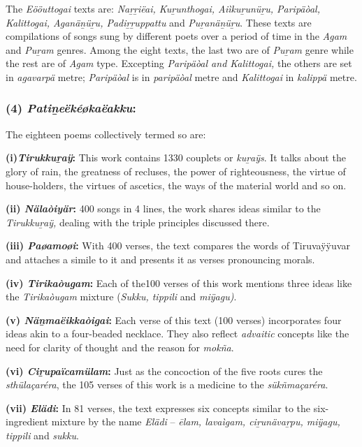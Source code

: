 The \textit{Eööuttogai} texts are: \textit{Naṟṟiëai, Kuṟunthogai, Aiìkuṟunüṟu, Paripäòal, Kalittogai, Aganäṉüṟu, Padiṟṟuppattu} and \textit{Puṟanäṉüṟu}. These texts are compilations of songs sung by different poets over a period of time in the \textit{Agam} and \textit{Puṟam} genres. Among the eight texts, the last two are of \textit{Puṟam} genre while the rest are of \textit{Agam} type. Excepting \textit{Paripäòal and Kalittogai,} the others are set in \textit{agavarpä} metre; \textit{Paripäòal} is in \textit{paripäòal} metre and \textit{Kalittogai} in \textit{kalippä} metre.


\subsubsection*{(4) \textit{Patiṉeëkéøkaëakku}:}

The eighteen poems collectively termed so are:

\textbf{(i)\textit{Tirukkuṟaÿ}:} This work contains 1330 couplets or \textit{kuṟaÿs}. It talks about the glory of rain, the greatness of recluses, the power of righteousness, the virtue of house-holders, the virtues of ascetics, the ways of the material world and so on.

\textbf{(ii) \textit{Nälaòiyär}:} 400 songs in 4 lines, the work shares ideas similar to the \textit{Tirukkuṟaÿ,} dealing with the triple principles discussed there.

\textbf{(iii) \textit{Paøamoøi}:} With 400 verses, the text compares the words of Tiruvaÿÿuvar and attaches a simile to it and presents it as verses pronouncing morals.

\textbf{(iv) \textit{Tirikaòugam}:} Each of the100 verses of this work mentions three ideas like the \textit{Tirikaòugam} mixture (\textit{Sukku, tippili} and \textit{miÿagu)}.

\textbf{(v) \textit{Näṉmaëikkaòigai}:} Each verse of this text (100 verses) incorporates four ideas akin to a four-beaded necklace. They also reflect \textit{advaitic} concepts like the need for clarity of thought and the reason for \textit{mokña}.

\textbf{(vi) \textit{Ciṟupaïcamülam}:} Just as the concoction of the five roots cures the \textit{sthülaçaréra}, the 105 verses of this work is a medicine to the \textit{sükñmaçaréra}.

\textbf{(vii) \textit{Elädi}:} In 81 verses, the text expresses six concepts similar to the six-ingredient mixture by the name \textit{Elädi} – \textit{ēlam, lavaìgam, ciṟunävaṟpu, miÿagu, tippili} and \textit{sukku}.

